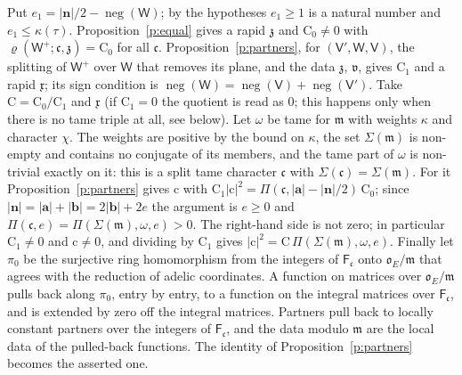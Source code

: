 \documentclass[11pt,a4paper]{article}
\makeatletter
\theoremstyle{plainx}
\theoremstyle{uprightx}
\renewenvironment{proof}[1][Proof]{\par\pushQED{\qed}\normalfont\topsep0pt\partopsep0pt
  \trivlist\item[\hskip\labelsep\itshape #1.]\ignorespaces}{\popQED\endtrivlist\@endpefalse}
\newcommand{\sF}{\mathsf{F}}
\newcommand{\ba}{\mathbf{a}}
\newcommand{\bb}{\mathbf{b}}
\newcommand{\bn}{\mathbf{n}}
\newcommand{\sW}{\mathsf{W}}
\newcommand{\sV}{\mathsf{V}}
\newcommand{\fc}{\mathfrak{c}}
\newcommand{\fm}{\mathfrak{m}}
\newcommand{\fv}{\mathfrak{v}}
\newcommand{\fx}{\mathfrak{x}}
\newcommand{\rc}{\mathrm{c}}
\newcommand{\rC}{\mathrm{C}}
\newcommand{\cO}{\mathfrak{o}}
\newcommand{\eqr}[3]{\varrho(#1;#2,#3)}
\newcommand{\LP}[2]{\Pi(#1,#2)}
\newcommand{\LPP}[3]{\Pi(#1,#2,#3)}
\newcommand{\negc}{\operatorname{neg}}
\makeatother
\begin{document}
\begin{proof}[Proof of Theorem 1]
Put $e_1=|\bn|/2-\negc(\sW)$; by the hypotheses $e_1\ge1$ is a natural number and $e_1\le\kappa(\tau)$.
Proposition~\ref{p:equal} gives a rapid $\mathfrak{z}$ and $\rC_0\ne0$ with $\eqr{\sW^{+}}{\fc}{\mathfrak{z}}=\rC_0$
for all $\fc$. Proposition~\ref{p:partners}, for $(\sV',\sW,\sV)$, the splitting of $\sW^{+}$ over $\sW$ that
removes its plane, and the data $\mathfrak{z}$, $\fv$, gives $\rC_1$ and a rapid $\fx$; its sign condition is
$\negc(\sW)=\negc(\sV)+\negc(\sV')$. Take $\rC=\rC_0/\rC_1$ and $\fx$ (if $\rC_1=0$ the quotient is read as $0$;
this happens only when there is no tame triple at all, see below). Let $\omega$ be tame for $\fm$ with weights
$\kappa$ and character $\chi$. The weights are positive by the bound on $\kappa$, the set $\Sigma(\fm)$ is non-empty and
contains no conjugate of its members, and the tame part of $\omega$ is non-trivial exactly on it: this is a split
tame character $\fc$ with $\Sigma(\fc)=\Sigma(\fm)$. For it Proposition~\ref{p:partners} gives $\rc$ with
$\rC_1|\rc|^2=\LP{\fc}{|\ba|-|\bn|/2}\,\rC_0$; since $|\bn|=|\ba|+|\bb|=2|\bb|+2e$ the argument is $e\ge0$ and
$\LP{\fc}{e}=\LPP{\Sigma(\fm)}{\omega}{e}>0$. The right-hand side is not zero; in particular $\rC_1\ne0$ and
$\rc\ne0$, and dividing by $\rC_1$ gives $|\rc|^2=\rC\,\LPP{\Sigma(\fm)}{\omega}{e}$. Finally
let $\pi_0$ be the surjective ring homomorphism from the integers of $\sF_{\fc}$ onto $\cO_E/\fm$ that agrees with
the reduction of adelic coordinates. A function on matrices over $\cO_E/\fm$ pulls back along $\pi_0$, entry by
entry, to a function on the integral matrices over $\sF_{\fc}$, and is extended by zero off the integral matrices.
Partners pull back to locally constant partners over the integers of $\sF_{\fc}$, and the data modulo $\fm$ are the
local data of the pulled-back functions. The identity of Proposition~\ref{p:partners} becomes the asserted one.
\end{proof}
\end{document}
